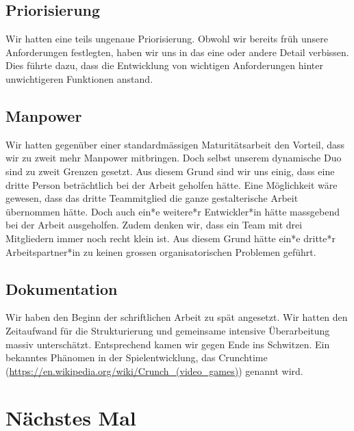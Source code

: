 \subsection*{Priorisierung}
Wir hatten eine teils ungenaue Priorisierung. Obwohl wir bereits früh unsere Anforderungen festlegten, haben wir uns in das eine oder andere Detail verbissen.
Dies führte dazu, dass die Entwicklung von wichtigen Anforderungen hinter unwichtigeren Funktionen anstand. 


\subsection*{Manpower} \label{subsec:neusm}
Wir hatten gegenüber einer standardmässigen Maturitätsarbeit den Vorteil, dass wir zu zweit mehr Manpower mitbringen. Doch selbst unserem dynamische Duo sind zu zweit Grenzen gesetzt.
Aus diesem Grund sind wir uns einig, dass eine dritte Person beträchtlich bei der Arbeit geholfen hätte. Eine Möglichkeit wäre gewesen, dass das dritte Teammitglied die ganze
gestalterische Arbeit übernommen hätte. Doch auch ein*e weitere*r Entwickler*in hätte massgebend bei der Arbeit ausgeholfen. Zudem denken wir, dass ein Team mit drei Mitgliedern
immer noch recht klein ist. Aus diesem Grund hätte ein*e dritte*r Arbeitspartner*in zu keinen grossen organisatorischen Problemen geführt.


\subsection*{Dokumentation}
Wir haben den Beginn der schriftlichen Arbeit zu spät angesetzt. Wir hatten den Zeitaufwand für die Strukturierung und gemeinsame intensive Überarbeitung massiv unterschätzt.
Entsprechend kamen wir gegen Ende ins Schwitzen. Ein bekanntes Phänomen in der Spielentwicklung, das Crunchtime (\url{https://en.wikipedia.org/wiki/Crunch_(video_games)}) genannt wird.

\section{Nächstes Mal}

